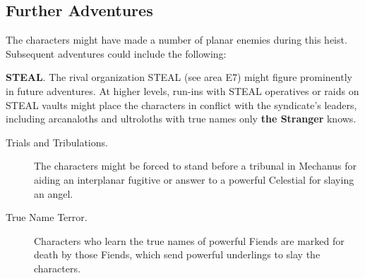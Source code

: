\documentclass[10pt,a4paper,twoside,bg=print,twocolumn,openany,nodeprecatedcode]{dndbook}
\begin{document}
\subsection{Further Adventures}
The characters might have made a number of planar enemies during this heist. Subsequent adventures could include the following:

\textbf{STEAL}. The rival organization STEAL (see area E7) might figure prominently in future adventures. At higher levels, run-ins with STEAL operatives or raids on STEAL vaults might place the characters in conflict with the syndicate's leaders, including arcanaloths and ultroloths with true names only \textbf{the Stranger} knows.


\begin{description}
\item[Trials and Tribulations.]
The characters might be forced to stand before a tribunal in Mechanus for aiding an interplanar fugitive or answer to a powerful Celestial for slaying an angel.
\item[True Name Terror.]
Characters who learn the true names of powerful Fiends are marked for death by those Fiends, which send powerful underlings to slay the characters.
\end{description}
\end{document}
